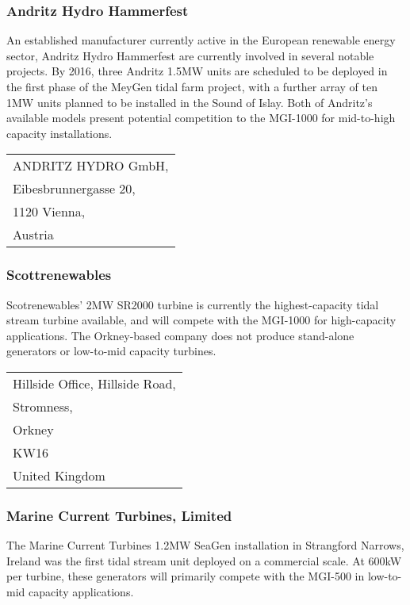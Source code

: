 \documentclass[a4paper,11pt]{article}
\begin{document}
\subsubsection{Andritz Hydro Hammerfest}
An established manufacturer currently active in the European renewable energy sector, Andritz Hydro Hammerfest  are currently involved in several notable projects. By 2016, three Andritz 1.5MW units are scheduled to be deployed in the first phase of the MeyGen tidal farm project, with a further array of ten 1MW units planned to be installed in the Sound of Islay\cite{r1}. Both of Andritz's available models present potential competition to the MGI-1000 for mid-to-high capacity installations.\\

\begin{tabular}{l}
ANDRITZ HYDRO GmbH,\\
Eibesbrunnergasse 20,\\
1120 Vienna,\\
Austria\\
\end{tabular}

\subsubsection{Scottrenewables}
Scotrenewables' 2MW SR2000 turbine is currently the highest-capacity tidal stream turbine available\cite{r2}, and will compete with the MGI-1000 for high-capacity applications. The Orkney-based company does not produce stand-alone generators or low-to-mid capacity turbines.\\

\begin{tabular}{l}
Hillside Office, Hillside Road, \\
Stromness, \\
Orkney\\
KW16\\
United Kingdom\\
\end{tabular}

\subsubsection{Marine Current Turbines, Limited}
The Marine Current Turbines 1.2MW SeaGen installation in Strangford Narrows, Ireland was the first tidal stream unit deployed on a commercial scale. At 600kW per turbine, these generators will primarily compete with the MGI-500 in low-to-mid capacity applications\cite{r3}.\\
\end{document}
